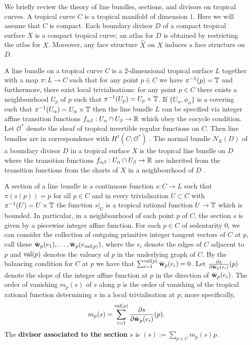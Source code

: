 We briefly review the theory of line bundles, sections, and divisors on tropical curves. 
A tropical curve  $C$ is a tropical manifold of dimension $1$. Here we will assume that $C$ is compact. 
Each boundary divisor $D$ of a compact tropical surface $X$ is a compact tropical curve; an atlas for $D$ is obtained by restricting the atlas for $X$. Moreover, any face structure $\hat X$ on $X$ induces a face structure on $D$.

A line bundle on a tropical curve $C$ is a $2$-dimensional tropical surface $L$ together with a map $\pi : L \to C$ such that for any point $p \in C$ we have $\pi^{-1}(p) = \mathbb{T}$ and furthermore, there exist local trivialisations: for any point $p \in C$ there exists a neighbourhood $U_p$ of $p$ such that  $\pi^{-1}(U_{p}) = U_{p} \times \mathbb{T}$.  If $\{U_{\alpha}, \phi_{\alpha}\}$ is a covering such that $\pi^{-1}(U_{\alpha}) = U_{\alpha} \times \mathbb{T}$ then the line bundle $L$ can be specified via integer affine transition functions $f_{\alpha \beta} : U_{\alpha} \cap U_{\beta} \to \mathbb{R}$ which obey the cocycle condition. 
Let $\mathcal{O}^*$ denote the sheaf of tropical invertible regular functions on $C$. Then line bundles are in correspondence with $H^1(C ; \mathcal{O}^*)$ \cite{MikZha:Jac}. 
The normal bundle $N_X(D)$ of a boundary divisor $D$ in a tropical surface $X$ is the tropical line bundle on $D$ where the transition functions $f_{\alpha \beta} : U_{\alpha} \cap U_{\beta} \to \mathbb{R}$ are inherited from the transition functions from the charts of $X$ in a neighbourhood of $D$ \cite[Section 3.5.4]{Shaw:Surf}.

A section of a line bundle is a continuous function $s : C \to L$ such that $\pi(s(p)) = p$ for all $p \in C$ and in every trivialisation $U \subset C$ with $\pi^{-1}(U) = U \times \mathbb{T}$ the function $s|_U$ is a tropical rational function $U \to \mathbb{T}$ which is bounded. In particular, in a neighbourhood of  each point $p$ of $C$, the section $s$ is given by a piecewise integer affine  function. 
For each $p \in C$ of sedentarity $0$,  we can consider the collection of outgoing primitive integer tangent vectors of $C$ at $p$, call these $\bar{{\bf w}}_p(e_1), \dots, \bar{{\bf w}}_p(e_{{\rm val}(p)})$, where the $e_i$ denote the edges of $C$ adjacent to $p$ and  ${\rm val}(p)$ denotes the valency of $p$ in the underlying graph of $C$. 
By the balancing condition for $C$ at $p$ we have  that $\sum_{i = 1}^{{\rm val}(p)} \bar{{\bf w}}_p(e_i) = 0$. 
Let $\frac{\partial s}{\partial  \bar{{\bf w}}_p(e_i)}(p)$ denote the slope of the integer affine function at $p$ in the direction of $ \bar{{\bf w}}_p(e_i)$. The order of vanishing $m_p(s)$ of $s$ along $p$ is the order of vanishing of the tropical rational function determining $s$ in a local trivialisation at $p$; more specifically, $$m_p(s) = \sum_{i = 1}^{{\rm val}(p)}\frac{\partial s}{\partial \bar{{\bf w}}_p(e_i)} (p).$$
The {\bf  divisor associated to the section} $s$ is $(s) := \sum_{p \in C} m_p(s) p$. 

